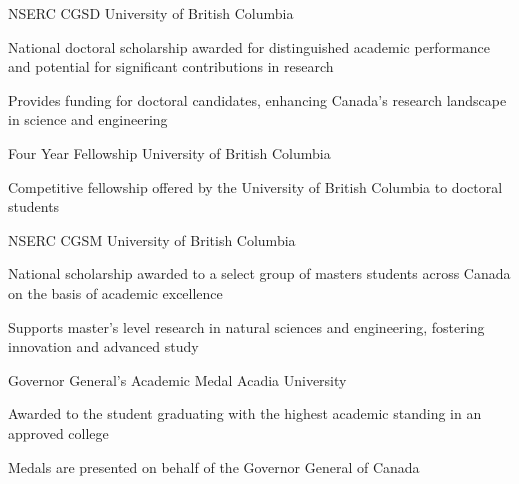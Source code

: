 \begin{cventries}
    \cvskillentry
    {NSERC CGSD} %
    {University of British Columbia} %
    {} %
    {} %
    {\begin{cvitems} %
        \item National doctoral scholarship awarded for distinguished academic performance and potential for significant contributions in research
        \item Provides funding for doctoral candidates, enhancing Canada’s research landscape in science and engineering
    \end{cvitems}}

    \cvskillentry
    {Four Year Fellowship} %
    {University of British Columbia} %
    {} %
    {} %
    {\begin{cvitems} %
        \item Competitive fellowship offered by the University of British Columbia to doctoral students
    \end{cvitems}}

    \cvskillentry
    {NSERC CGSM} %
    {University of British Columbia} %
    {} %
    {} %
    {\begin{cvitems} %
        \item National scholarship awarded to a select group of masters students across Canada on the basis of academic excellence
        \item Supports master’s level research in natural sciences and engineering, fostering innovation and advanced study
    \end{cvitems}}

    \cvskillentry
    {Governor General's Academic Medal} %
    {Acadia University} %
    {} %
    {} %
    {\begin{cvitems} %
        \item  Awarded to the student graduating with the highest academic standing in an approved college
        \item Medals are presented on behalf of the Governor General of Canada
    \end{cvitems}}
\end{cventries}

